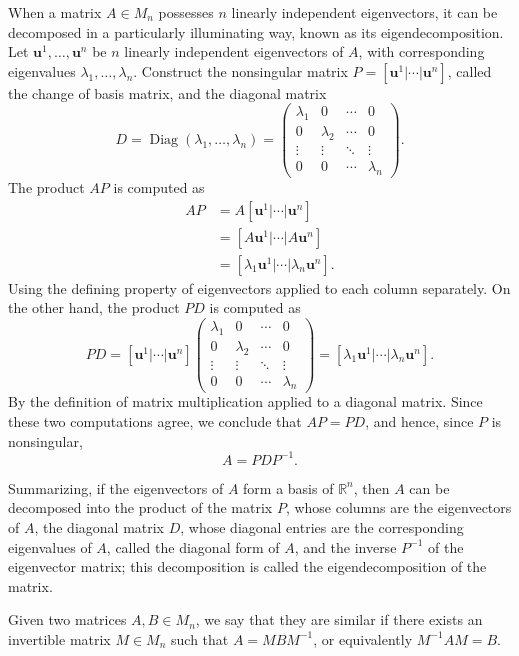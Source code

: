 When a matrix $A \in M_n$ possesses $n$ linearly independent eigenvectors, it can be decomposed in a particularly illuminating way, known as its eigendecomposition. Let $\mathbf{u}^1, \dots, \mathbf{u}^n$ be $n$ linearly independent eigenvectors of $A$, with corresponding eigenvalues $\lambda_1, \dots, \lambda_n$. Construct the nonsingular matrix $P = [\mathbf{u}^1 | \cdots | \mathbf{u}^n]$, called the change of basis matrix, and the diagonal matrix
\[
D = \operatorname{Diag}(\lambda_1, \dots, \lambda_n) = \begin{pmatrix} \lambda_1 & 0 & \cdots & 0 \\ 0 & \lambda_2 & \cdots & 0 \\ \vdots & \vdots & \ddots & \vdots \\ 0 & 0 & \cdots & \lambda_n \end{pmatrix}.
\]
The product $AP$ is computed as
\[
\begin{aligned}
AP &= A[\mathbf{u}^1 | \cdots | \mathbf{u}^n] \\
&= [A\mathbf{u}^1 | \cdots | A\mathbf{u}^n] \\
&= [\lambda_1 \mathbf{u}^1 | \cdots | \lambda_n \mathbf{u}^n].
\end{aligned}
\]
Using the defining property of eigenvectors applied to each column separately. On the other hand, the product $PD$ is computed as
\[
PD = [\mathbf{u}^1 | \cdots | \mathbf{u}^n] \begin{pmatrix} \lambda_1 & 0 & \cdots & 0 \\ 0 & \lambda_2 & \cdots & 0 \\ \vdots & \vdots & \ddots & \vdots \\ 0 & 0 & \cdots & \lambda_n \end{pmatrix} = [\lambda_1 \mathbf{u}^1 | \cdots | \lambda_n \mathbf{u}^n].
\]
By the definition of matrix multiplication applied to a diagonal matrix. Since these two computations agree, we conclude that $AP = PD$, and hence, since $P$ is nonsingular,
\[
A = PDP^{-1}.
\]

Summarizing, if the eigenvectors of $A$ form a basis of $\mathbb{R}^n$, then $A$ can be decomposed into the product of the matrix $P$, whose columns are the eigenvectors of $A$, the diagonal matrix $D$, whose diagonal entries are the corresponding eigenvalues of $A$, called the diagonal form of $A$, and the inverse $P^{-1}$ of the eigenvector matrix; this decomposition is called the eigendecomposition of the matrix.

\begin{definition}
Given two matrices $A, B \in M_n$, we say that they are similar if there exists an invertible matrix $M \in M_n$ such that $A = MBM^{-1}$, or equivalently $M^{-1}AM = B$.
\end{definition}

